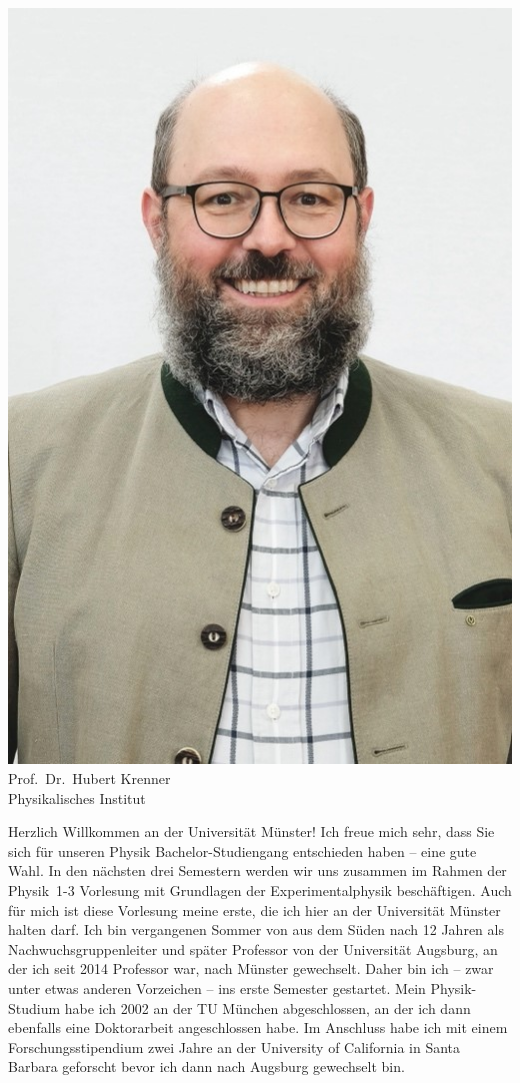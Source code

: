 \begin{multicols}{2}
\begin{center}
\includegraphics[width=0.8\columnwidth]{res/vorstellungsfotos/krenner.jpg}\\
\smallskip
Prof.\ Dr.\ Hubert Krenner\\
Physikalisches Institut
\end{center}

Herzlich Willkommen an der Universität Münster! Ich freue mich sehr, dass Sie sich für unseren Physik Bachelor-Studiengang entschieden haben – eine gute Wahl. In den nächsten drei Semestern werden wir uns zusammen im Rahmen der Physik~1-3 Vorlesung mit Grundlagen der Experimentalphysik beschäftigen. Auch für mich ist diese Vorlesung meine erste, die ich hier an der Universität Münster halten darf. Ich bin vergangenen Sommer von aus dem Süden nach 12 Jahren als Nachwuchsgruppenleiter und später Professor von der Universität Augsburg, an der ich seit 2014 Professor war, nach Münster gewechselt. Daher bin ich – zwar unter etwas anderen Vorzeichen – ins erste Semester gestartet. Mein Physik-Studium habe ich 2002 an der TU München abgeschlossen, an der ich dann ebenfalls eine Doktorarbeit angeschlossen habe. Im Anschluss habe ich mit einem Forschungsstipendium zwei Jahre an der University of California in Santa Barbara geforscht bevor ich dann nach Augsburg gewechselt bin.


\end{multicols}
